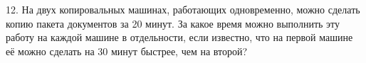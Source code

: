 12. На двух копировальных машинах, работающих одновременно, можно сделать копию пакета документов за 20 минут. За какое время можно выполнить эту работу на каждой машине в отдельности, если известно, что на первой машине её можно сделать на 30 минут быстрее, чем на второй?\\
